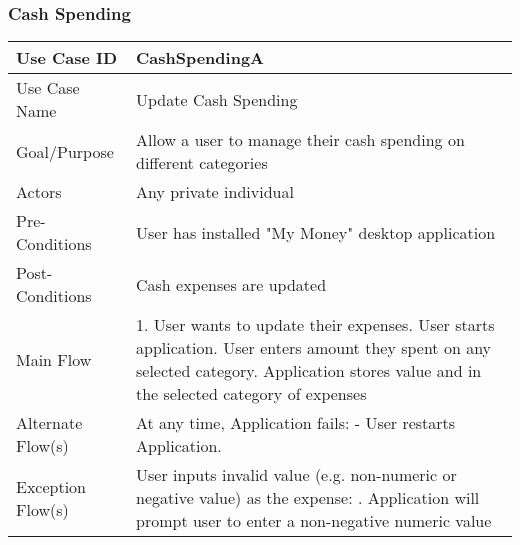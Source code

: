 \documentclass[12pt]{article}
\begin{document}
\subsubsection{Cash Spending} \label{uc:2}

\begin{center}
\begin{tabular}{| p{5cm} | p{10cm} |}
\hline

Use Case ID  & CashSpendingA\\
\hline
Use Case Name  & Update Cash Spending\\
\hline
Goal/Purpose  & Allow a user to manage their cash spending on different categories\\
\hline
Actors  & Any private individual \\
\hline
Pre-Conditions &  User has installed "My Money" desktop application \\
\hline
Post-Conditions & Cash expenses are updated  \\
\hline
Main Flow & 
1. User wants to update their expenses\newline 
2. User starts application\newline
3. User enters amount they spent on any selected category\newline
4. Application stores value and in the selected category of expenses
\\
\hline
Alternate Flow(s) & 
At any time, Application fails: \newline
   - User restarts Application.
\\
\hline
Exception Flow(s) & User inputs invalid value (e.g. non-numeric or negative value) as the expense: \newline
1. Application will prompt user to enter a non-negative numeric value\\
\hline

\end{tabular}
\end{center}
\end{document}
